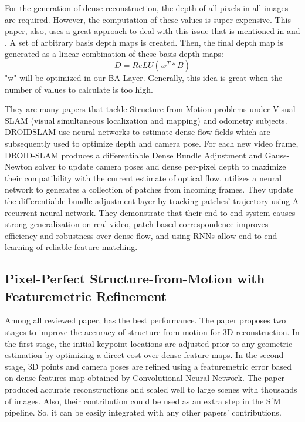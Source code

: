 \documentclass[11pt]{article}
\begin{document}
    For the generation of dense reconstruction, the depth of all pixels in all images are required. However, the
    computation of these values is super expensive. This paper, also, uses a great approach to deal with this
    issue that is mentioned in \cite{tateno2017cnnslam} and \cite{yang2018deep}. A set of arbitrary basis depth maps
    is created. Then, the final depth map is generated as a linear combination of these basis depth maps:
    \[ D = ReLU(w^T * B) \]
    "w" will be optimized in our BA-Layer. Generally, this idea is great when the number of
    values to calculate is too high.

    They are many papers that tackle Structure from Motion problems under Visual SLAM (visual simultaneous
    localization and mapping) and odometry subjects.
    DROIDSLAM \cite{teed2022droidslam} use neural networks to estimate dense flow fields which are subsequently
    used to optimize depth and camera pose. For each new video frame, DROID-SLAM produces a differentiable Dense
    Bundle Adjustment and Gauss-Newton solver to update camera poses and dense per-pixel depth to maximize their
    compatibility with the current estimate of optical flow. \cite{teed2022deep} utilizes a neural network to
    generates a collection of patches from incoming frames. They update the differentiable bundle adjustment layer
    by tracking patches' trajectory using A recurrent neural network. They demonstrate that their end-to-end system
    causes strong generalization on real video, patch-based correspondence improves efficiency and robustness over
    dense flow, and using RNNs allow end-to-end learning of reliable feature matching.

    \newpage
    \subsection{Pixel-Perfect Structure-from-Motion with Featuremetric Refinement}
    Among all reviewed paper, \cite{lindenberger2021pixsfm} has the best performance. The paper
    proposes two stages to improve the accuracy of structure-from-motion for 3D reconstruction.
    In the first stage, the initial keypoint locations are adjusted prior to any geometric estimation
    by optimizing a direct cost over dense feature maps. In the second stage, 3D points and camera poses
    are refined using a featuremetric error based on dense features map obtained by Convolutional Neural Network.
    The paper produced accurate reconstructions and scaled well to large scenes with thousands of images.
    Also, their contribution could be used as an extra step in the SfM pipeline. So, it can be easily
    integrated with any other papers' contributions.
\end{document}

